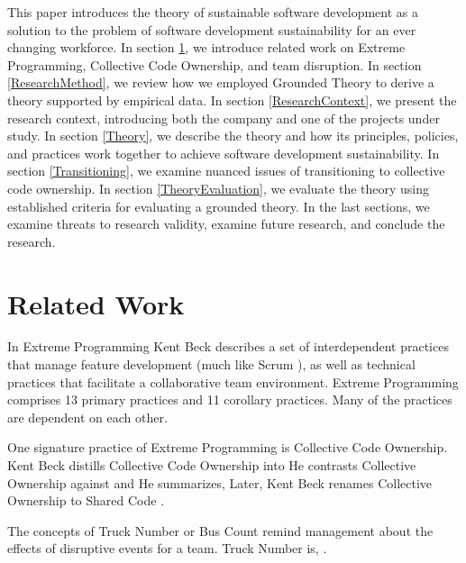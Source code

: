 This paper introduces the theory of sustainable software development as a solution to the problem of software development sustainability for an ever changing workforce. In section \ref{RelatedWork}, we introduce related work on Extreme Programming, Collective Code Ownership, and team disruption. In section \ref{ResearchMethod}, we review how we employed Grounded Theory to derive a theory supported by empirical data. In section \ref{ResearchContext}, we present the research context, introducing both the company and one of the projects under study. In section \ref{Theory}, we describe the theory and how its principles, policies, and practices work together to achieve software development sustainability. In section \ref{Transitioning}, we examine nuanced issues of transitioning to collective code ownership. In section \ref{TheoryEvaluation}, we evaluate the theory using established criteria for evaluating a grounded theory. In the last sections, we examine threats to research validity, examine future research, and conclude the research.
\section{Related Work}
\label{RelatedWork}
In Extreme Programming \cite{ExtremeProgramming2004} Kent Beck describes a set of interdependent practices that manage feature development (much like Scrum \cite{Scrum}), as well as technical practices that facilitate a collaborative team environment.  Extreme Programming comprises 13 primary practices and 11 corollary practices. Many of the practices are dependent on each other.  

One signature practice of Extreme Programming is Collective Code Ownership. Kent Beck distills Collective Code Ownership into  He contrasts Collective Ownership against  and  He summarizes,   \cite{ExtremeProgramming2000} Later, Kent Beck renames Collective Ownership to Shared Code \cite{ExtremeProgramming2004}. 

The concepts of Truck Number or Bus Count remind management about the effects of disruptive events for a team. Truck Number is,  \cite{WikiTruckNumber}. 

